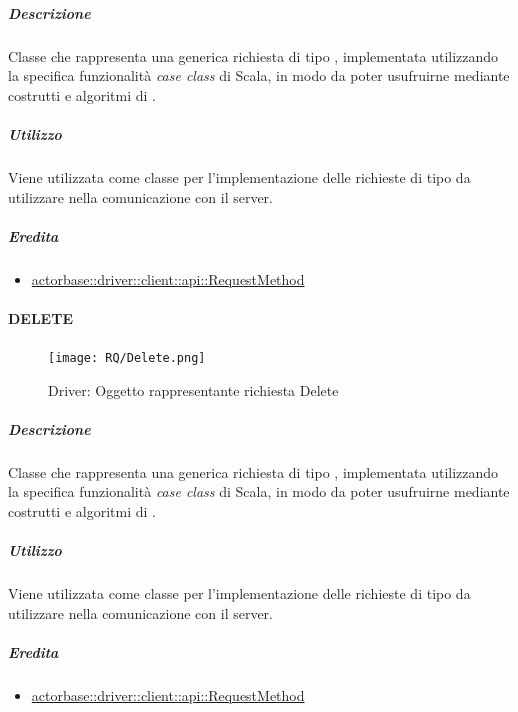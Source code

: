 \documentclass{scalatekids-article}
\begin{document}
\subparagraph{Descrizione}

Classe che rappresenta una generica richiesta  di tipo
, implementata utilizzando la specifica funzionalità \textit{case
  class} di Scala, in modo da poter usufruirne mediante costrutti e algoritmi di
.

\subparagraph{Utilizzo}

Viene utilizzata come classe per l'implementazione delle richieste 
di tipo  da utilizzare nella comunicazione con il server.

\subparagraph{Eredita}

\begin{itemize}
\item \hyperref[sec:actorbase::driver::client::api::RequestMethod]{actorbase::driver::client::api::RequestMethod}
\end{itemize}


\paragraph{DELETE}
\label{sec:actorbase::driver::client::api::DELETE}

\begin{figure}[H]
  \begin{center}
    \texttt{[image: RQ/Delete.png]}
    \caption{Driver: Oggetto rappresentante richiesta Delete}
  \end{center}
\end{figure}

\subparagraph{Descrizione}

Classe che rappresenta una generica richiesta  di tipo
, implementata utilizzando la specifica funzionalità \textit{case
  class} di Scala, in modo da poter usufruirne mediante costrutti e algoritmi di
.

\subparagraph{Utilizzo}

Viene utilizzata come classe per l'implementazione delle richieste 
di tipo  da utilizzare nella comunicazione con il server.

\subparagraph{Eredita}

\begin{itemize}
\item \hyperref[sec:actorbase::driver::client::api::RequestMethod]{actorbase::driver::client::api::RequestMethod}
\end{itemize}
\end{document}
